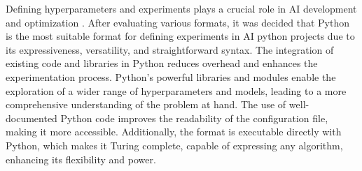 Defining hyperparameters and experiments plays a crucial role in AI development and optimization \cite{wu2019hyperparameter}. After evaluating various formats, it was decided that Python is the most suitable format for defining experiments in AI python projects due to its expressiveness, versatility, and straightforward syntax. The integration of existing code and libraries in Python reduces overhead and enhances the experimentation process. Python's powerful libraries and modules enable the exploration of a wider range of hyperparameters and models, leading to a more comprehensive understanding of the problem at hand. The use of well-documented Python code improves the readability of the configuration file, making it more accessible. Additionally, the format is executable directly with Python, which makes it Turing complete, capable of expressing any algorithm, enhancing its flexibility and power.










